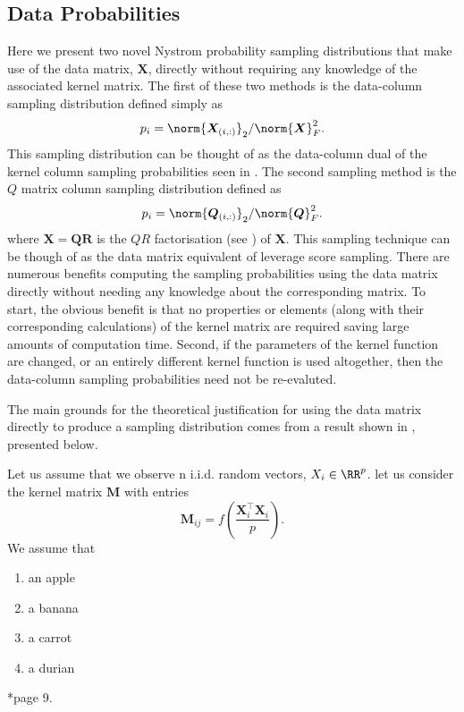 \subsection{Data Probabilities}\label{Section2.3}

Here we present two novel Nystrom probability sampling distributions that make use of the data matrix, $\bm{X}$, directly without requiring any knowledge of the associated kernel matrix. The first of these two methods is the data-column sampling distribution defined simply as
\begin{equation*}
    p_{i} = \norm{\bm{X}_{(i,:)}}_2 / \norm{\bm{X}}_{F}^2.
\end{equation*}
This sampling distribution can be thought of as the data-column dual of the kernel column sampling probabilities seen in . The second sampling method is the $Q$ matrix column sampling distribution defined as
\begin{equation*}
    p_{i} = \norm{\bm{Q}_{(i,:)}}_2 / \norm{\bm{Q}}_{F}^2.
\end{equation*}
where $\bm{X} = \bm{Q} \bm{R}$ is the $QR$ factorisation (see ) of $\bm{X}$. This sampling technique can be though of as the data matrix equivalent of leverage score sampling. There are numerous benefits computing the sampling probabilities using the data matrix directly without needing any knowledge about the corresponding matrix. To start, the obvious benefit is that no properties or elements (along with their corresponding calculations) of the kernel matrix are required saving large amounts of computation time. Second, if the parameters of the kernel function are changed, or an entirely different kernel function is used altogether, then the data-column sampling probabilities need not be re-evaluted.

The main grounds for the theoretical justification for using the data matrix directly to produce a sampling distribution comes from a result shown in \cite{KarouiNoureddineEl2010TSOK}, presented below.

\renewcommand{\labelenumi}{(\alph{enumi})}

\begin{thm} \label{thm: inner-prof-kern-mat}
    Let us assume that we observe n i.i.d. random vectors, $X_i \in \RR^{p}$. let us consider the kernel matrix $\bm{M}$ with entries
    \begin{equation*}
        \bm{M}_{ij} = f \left( \frac{\bm{X}_{i}^{\intercal} \bm{X}_{i}}{p} \right).
    \end{equation*}
    We assume that
    \begin{enumerate}
        \item an apple
        \item a banana
        \item a carrot
        \item a durian
    \end{enumerate}
    \cite{KarouiNoureddineEl2010TSOK}*{page 9}.
\end{thm}
